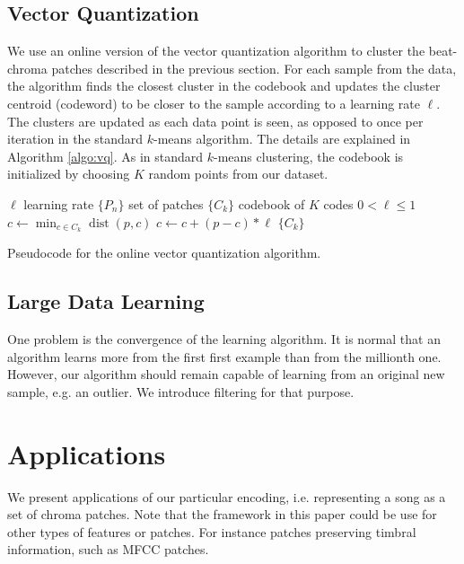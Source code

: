 \documentclass{sig-alternate}
\DeclareMathOperator*{\dist}{dist}
\begin{document}
\subsection{Vector Quantization}
We use an online version of the vector quantization algorithm
\cite{Gersho1991} to cluster the beat-chroma patches described in the
previous section.
For each sample from the data, the algorithm finds the closest cluster
in the codebook and updates the cluster centroid (codeword) to be
closer to the sample according to a learning rate $\ell$.
The clusters are updated as each data point is seen, as opposed to
once per iteration in the standard $k$-means algorithm.
The details are explained in Algorithm \ref{algo:vq}.
%
As in standard $k$-means clustering, the codebook is initialized by
choosing $K$ random points from our dataset.

\begin{algorithm}
\begin{algorithmic}
\STATE$\ell$ learning rate
\STATE$\{P_n\}$ set of patches
\STATE$\{C_k\}$ codebook of $K$ codes
\REQUIRE $0 < \ell \leq 1$
\STATE$c \leftarrow \min_{c \in C_k} \dist(p,c)$
\STATE$c \leftarrow c + (p - c) * \ell$
\ENDFOR
\ENDFOR
\RETURN $\{C_k\}$
\caption{\small{Pseudocode for the online vector quantization
    algorithm.}\label{algo:vq}}
\end{algorithmic}
\end{algorithm}


\subsection{Large Data Learning}
One problem is the convergence of the learning algorithm. It is normal
that an algorithm learns more from the first first example than from the
millionth one. However, our algorithm should remain capable of learning
from an original new sample, e.g. an outlier. We introduce filtering
for that purpose.


\section{Applications}
We present applications of our particular encoding, i.e. representing
a song as a set of chroma patches. Note that the framework in this
paper could be use for other types of features or patches. For instance
patches preserving timbral information, such as MFCC patches.
\end{document}
